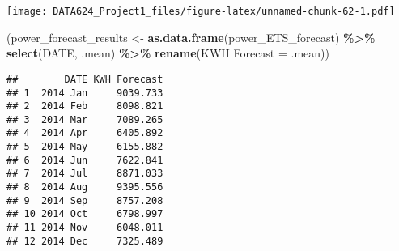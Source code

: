 \documentclass[
]{article}
\newenvironment{Shaded}{\begin{snugshade}}{\end{snugshade}}
\newcommand{\FunctionTok}[1]{\textcolor[rgb]{0.13,0.29,0.53}{\textbf{#1}}}
\newcommand{\NormalTok}[1]{#1}
\newcommand{\OtherTok}[1]{\textcolor[rgb]{0.56,0.35,0.01}{#1}}
\newcommand{\SpecialCharTok}[1]{\textcolor[rgb]{0.81,0.36,0.00}{\textbf{#1}}}
\newcommand{\StringTok}[1]{\textcolor[rgb]{0.31,0.60,0.02}{#1}}
\begin{document}
\texttt{[image: DATA624\_Project1\_files/figure-latex/unnamed-chunk-62-1.pdf]}

\begin{Shaded}
\begin{Highlighting}[]
\NormalTok{(power\_forecast\_results }\OtherTok{\textless{}{-}} 
  \FunctionTok{as.data.frame}\NormalTok{(power\_ETS\_forecast) }\SpecialCharTok{\%\textgreater{}\%}
    \FunctionTok{select}\NormalTok{(DATE, .mean) }\SpecialCharTok{\%\textgreater{}\%} 
      \FunctionTok{rename}\NormalTok{(}\StringTok{\textquotesingle{}KWH Forecast\textquotesingle{}} \OtherTok{=}\NormalTok{ .mean))}
\end{Highlighting}
\end{Shaded}

\begin{verbatim}
##        DATE KWH Forecast
## 1  2014 Jan     9039.733
## 2  2014 Feb     8098.821
## 3  2014 Mar     7089.265
## 4  2014 Apr     6405.892
## 5  2014 May     6155.882
## 6  2014 Jun     7622.841
## 7  2014 Jul     8871.033
## 8  2014 Aug     9395.556
## 9  2014 Sep     8757.208
## 10 2014 Oct     6798.997
## 11 2014 Nov     6048.011
## 12 2014 Dec     7325.489
\end{verbatim}
\end{document}
